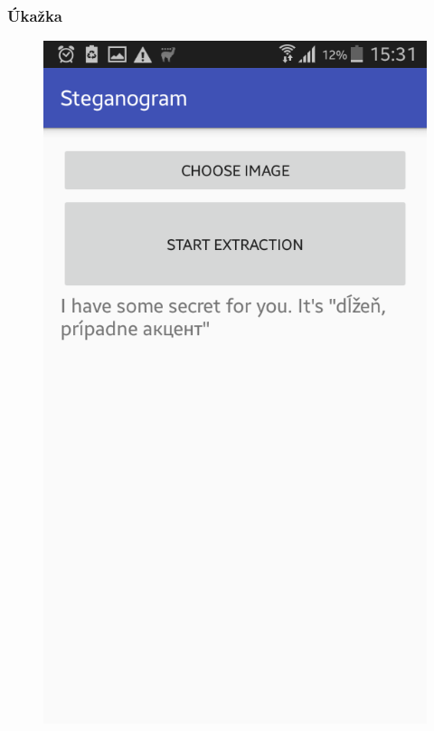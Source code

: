 \documentclass{beamer}
\begin{document}
\begin{frame}
    \frametitle{Úkažka}
    \begin{figure}
    \centerline{\includegraphics[height=0.8 \textheight]{images/screen_7.png}}
    
    \end{figure}
\end{frame}
\end{document}
